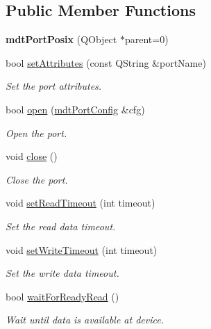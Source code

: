 \subsection*{Public Member Functions}
\begin{DoxyCompactItemize}
\item 
\hypertarget{classmdt_port_posix_ac122e8dde0e224afb3557d29a62de114}{
{\bfseries mdtPortPosix} (QObject $\ast$parent=0)}
\label{classmdt_port_posix_ac122e8dde0e224afb3557d29a62de114}

\item 
bool \hyperlink{classmdt_port_posix_a32a532f5148226da19ee4acc6ec63201}{setAttributes} (const QString \&portName)
\begin{DoxyCompactList}\small\item\em Set the port attributes. \end{DoxyCompactList}\item 
bool \hyperlink{classmdt_port_posix_aba7e87cb2423bfd61a248cc5d23a8517}{open} (\hyperlink{classmdt_port_config}{mdtPortConfig} \&cfg)
\begin{DoxyCompactList}\small\item\em Open the port. \end{DoxyCompactList}\item 
void \hyperlink{classmdt_port_posix_a778c8d4f6fadd1da725f4287af38f7f0}{close} ()
\begin{DoxyCompactList}\small\item\em Close the port. \end{DoxyCompactList}\item 
void \hyperlink{classmdt_port_posix_a7ab7e4a7dccbd58702f2c37335b900c8}{setReadTimeout} (int timeout)
\begin{DoxyCompactList}\small\item\em Set the read data timeout. \end{DoxyCompactList}\item 
void \hyperlink{classmdt_port_posix_a577a51bf0373f478b32bb1c1e5c4726c}{setWriteTimeout} (int timeout)
\begin{DoxyCompactList}\small\item\em Set the write data timeout. \end{DoxyCompactList}\item 
bool \hyperlink{classmdt_port_posix_a5547db404f974f1a04ba2e303b0aaed0}{waitForReadyRead} ()
\begin{DoxyCompactList}\small\item\em Wait until data is available at device. \end{DoxyCompactList}\item 

\end{DoxyCompactItemize}
